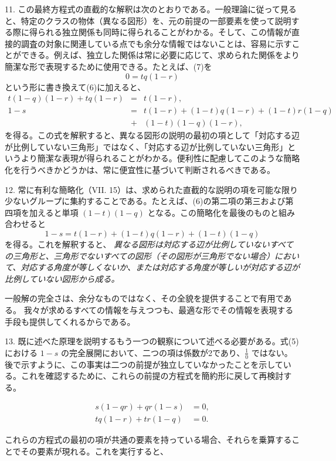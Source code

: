 \documentclass[a4paper,11pt,openany]{ltjsbook}
\begin{document}
11. この最終方程式の直截的な解釈は次のとおりである。一般理論に従って見ると、特定のクラスの物体（異なる図形）を、元の前提の一部要素を使って説明する際に得られる独立関係も同時に得られることがわかる。そして、この情報が直接的調査の対象に関連している点でも余分な情報ではないことは、容易に示すことができる。例えば、独立した関係は常に必要に応じて、求められた関係をより簡潔な形で表現するために使用できる。たとえば、(7)を
\[
0 = t q (1 - r)
\]
という形に書き換えて(6)に加えると、
\begin{eqnarray*}
t (1 - q) (1 - r) + t q (1 - r) &=& t (1 - r),\\
1 - s &=& t (1 - r) + (1 - t) q (1 - r) + (1 - t) r (1 - q) \\
&+& (1 - t) (1 - q) (1 - r),
\end{eqnarray*}
を得る。この式を解釈すると、異なる図形の説明の最初の項として「対応する辺が比例していない三角形」ではなく、「対応する辺が比例していない三角形」というより簡潔な表現が得られることがわかる。便利性に配慮してこのような簡略化を行うべきかどうかは、常に便宜性に基づいて判断されるべきである。

12. 常に有利な簡略化（VII. 15）は、求められた直截的な説明の項を可能な限り少ないグループに集約することである。たとえば、(6)の第二項の第三および第四項を加えると単項 $(1 - t)(1 - q)$ となる。この簡略化を最後のものと組み合わせると
\[
1 - s = t (1 - r) + (1 - t) q (1 - r) + (1 - t) (1 - q)
\]
を得る。これを解釈すると、
\textit{異なる図形は対応する辺が比例していないすべての三角形と、三角形でないすべての図形（その図形が三角形でない場合）において、対応する角度が等しくないか、または対応する角度が等しいが対応する辺が比例していない図形から成る。}

一般解の完全さは、余分なものではなく、その全貌を提供することで有用である。
我々が求めるすべての情報を与えつつも、最適な形でその情報を表現する手段も提供してくれるからである。

13. 既に述べた原理を説明するもう一つの観察について述べる必要がある。式(5)における $1 - s$ の完全展開において、二つの項は係数が2であり、$\frac{1}{0}$ ではない。後で示すように、この事実は二つの前提が独立していなかったことを示している。これを確認するために、これらの前提の方程式を簡約形に戻して再検討する。

\begin{eqnarray*}
s(1-qr) + qr(1-s) &= 0,\\
tq(1-r) + tr(1-q) &= 0.
\end{eqnarray*}

これらの方程式の最初の項が共通の要素を持っている場合、それらを乗算することでその要素が現れる。これを実行すると、
\end{document}
